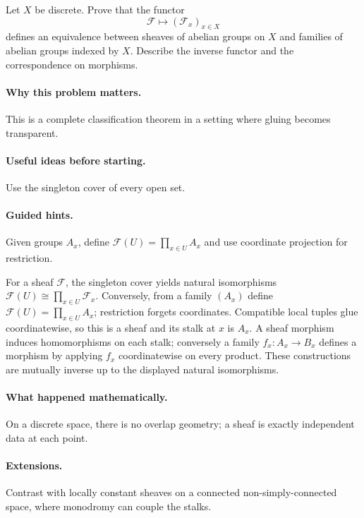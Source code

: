 \begin{problem}
Let $X$ be discrete. Prove that the functor
\[
\mathcal F\longmapsto(\mathcal F_x)_{x\in X}
\]
defines an equivalence between sheaves of abelian groups on $X$ and families of abelian groups indexed by $X$. Describe the inverse functor and the correspondence on morphisms.
\end{problem}

\paragraph{Why this problem matters.}
This is a complete classification theorem in a setting where gluing becomes transparent.

\paragraph{Useful ideas before starting.}
Use the singleton cover of every open set.

\paragraph{Guided hints.}
Given groups $A_x$, define $\mathcal F(U)=\prod_{x\in U}A_x$ and use coordinate projection for restriction.

\ifdefined\FullProblemDossiers
\begin{solution}
For a sheaf $\mathcal F$, the singleton cover yields natural isomorphisms $\mathcal F(U)\cong\prod_{x\in U}\mathcal F_x$. Conversely, from a family $(A_x)$ define $\mathcal F(U)=\prod_{x\in U}A_x$; restriction forgets coordinates. Compatible local tuples glue coordinatewise, so this is a sheaf and its stalk at $x$ is $A_x$. A sheaf morphism induces homomorphisms on each stalk; conversely a family $f_x:A_x\to B_x$ defines a morphism by applying $f_x$ coordinatewise on every product. These constructions are mutually inverse up to the displayed natural isomorphisms.
\end{solution}

\paragraph{What happened mathematically.}
On a discrete space, there is no overlap geometry; a sheaf is exactly independent data at each point.

\paragraph{Extensions.}
Contrast with locally constant sheaves on a connected non-simply-connected space, where monodromy can couple the stalks.
\fi
